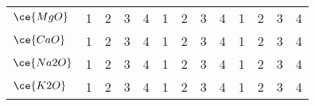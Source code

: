 \begin{table*}[]
{\begin{tabular}{l|cccc|cccc|cccc}
$\ce{MgO}$   & \multicolumn{1}{c}{1}     & \multicolumn{1}{c}{2}           & \multicolumn{1}{c}{3}       & \multicolumn{1}{c|}{4}            & \multicolumn{1}{c}{1}     & \multicolumn{1}{c}{2}           & \multicolumn{1}{c}{3}       & \multicolumn{1}{c|}{4}            & \multicolumn{1}{c}{1}     & \multicolumn{1}{c}{2}           & \multicolumn{1}{c}{3}       & 4                             \\
$\ce{CaO}$   & \multicolumn{1}{c}{1}     & \multicolumn{1}{c}{2}           & \multicolumn{1}{c}{3}       & \multicolumn{1}{c|}{4}            & \multicolumn{1}{c}{1}     & \multicolumn{1}{c}{2}           & \multicolumn{1}{c}{3}       & \multicolumn{1}{c|}{4}            & \multicolumn{1}{c}{1}     & \multicolumn{1}{c}{2}           & \multicolumn{1}{c}{3}       & 4                             \\
$\ce{Na2O}$  & \multicolumn{1}{c}{1}     & \multicolumn{1}{c}{2}           & \multicolumn{1}{c}{3}       & \multicolumn{1}{c|}{4}            & \multicolumn{1}{c}{1}     & \multicolumn{1}{c}{2}           & \multicolumn{1}{c}{3}       & \multicolumn{1}{c|}{4}            & \multicolumn{1}{c}{1}     & \multicolumn{1}{c}{2}           & \multicolumn{1}{c}{3}       & 4                             \\
$\ce{K2O}$   & \multicolumn{1}{c}{1}     & \multicolumn{1}{c}{2}           & \multicolumn{1}{c}{3}       & \multicolumn{1}{c|}{4}            & \multicolumn{1}{c}{1}     & \multicolumn{1}{c}{2}           & \multicolumn{1}{c}{3}       & \multicolumn{1}{c|}{4}            & \multicolumn{1}{c}{1}     & \multicolumn{1}{c}{2}           & \multicolumn{1}{c}{3}       & 4                             \\
\hline
\end{tabular}%
}
\end{table*}